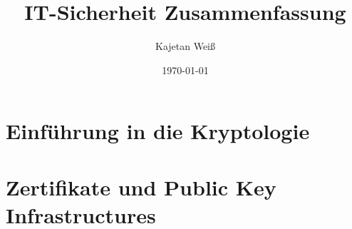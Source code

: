 %





\title{IT-Sicherheit Zusammenfassung}
\author{Kajetan Weiß}
\date{\today}
\maketitle



\tableofcontents

%

\part{Einführung in die Kryptologie}









\part{Zertifikate und Public Key Infrastructures}



%

